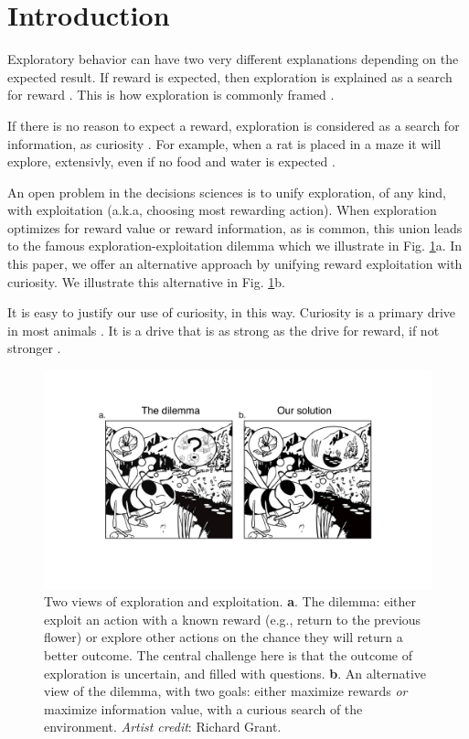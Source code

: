 \section*{Introduction}
Exploratory behavior can have two very different explanations depending on the expected result. If reward is expected, then exploration is explained as a search for reward \cite{Gupta2006,Sutton2018,Woodgate2017,Lee2011a,Schulz2018a,Calhoun2014}. This is how exploration is commonly framed \cite{Sutton2018}. 

If there is no reason to expect a reward, exploration is considered as a search for information, as curiosity \cite{Berlyne1950,Schmidhuber1991,Kidd2015,Jaegle2019,Sumner2019,Wang2019,Auersperg2015}. For example, when a rat is placed in a maze it will explore, extensivly, even if no food and water is expected \cite{Rosenberg2021}.

An open problem in the decisions sciences is to unify exploration, of any kind, with exploitation (a.k.a, choosing most rewarding action). When exploration optimizes for reward value or reward information, as is common, this union leads to the famous exploration-exploitation dilemma \cite{Kelly1956,Berger-Tal2014,Dayan1996,Thrun1992,Mehlhorn2015,Kobayashi2019} which we illustrate in Fig. \ref{fig:bee}a. In this paper, we offer an alternative approach by unifying reward exploitation with curiosity. We illustrate this alternative in Fig. \ref{fig:bee}b.  

It is easy to justify our use of curiosity, in this way. Curiosity is a primary drive in most animals \cite{Berlyne1950,Loewenstein1994,Inglis2001}. It is a drive that is as strong as the drive for reward, if not stronger \cite{Loewenstein1994,Kidd2015,Gottlieb2018,Sumner2019,Gopnik2020,Song2019,Wang2019}. 

\begin{figure}
	\includegraphics[width=.9\linewidth]{img/bee.pdf} 
	\caption{Two views of exploration and exploitation. \textbf{a}. The dilemma: either exploit an action with a known reward (e.g., return to the previous flower) or explore other actions on the chance they will return a better outcome. The central challenge here is that the outcome of exploration is uncertain, and filled with questions. \textbf{b}. An alternative view of the dilemma, with two goals: either maximize rewards \textit{or} maximize information value, with a curious search of the environment. \textit{Artist credit}: Richard Grant.}
	\label{fig:bee} 
\end{figure}

